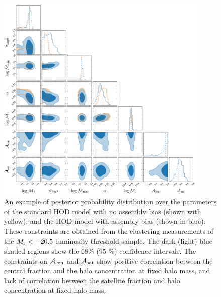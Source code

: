 \documentclass[12pt, preprint]{aastex}
\newcommand{\acen}{\mathcal{A}_{\rm cen}}
\newcommand{\asat}{\mathcal{A}_{\rm sat}}
\begin{document}
\begin{figure}[p]~\\
\begin{center}
\includegraphics[width=0.9\textwidth]{post20_5combined.pdf}
\caption{An example of posterior probability distribution over the parameters of the standard HOD model with no assembly bias (shown with yellow), and the HOD model with assembly bias (shown in blue). These constraints are obtained from the clustering measurements of the $M_{\rm r} < -20.5$ luminosity threshold sample. The dark (light) blue shaded regions show the 68$\%$ (95 $\%$) confidence intervals. The constraints on $\acen$ and $\asat$ show positive correlation between the central fraction and the halo concentration at fixed halo mass, and lack of correlation between the satellite fraction and halo concentration at fixed halo mass.}
\label{fig:posterior}
\end{center}
\end{figure}



\end{document}
